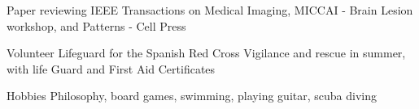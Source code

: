 
\begin{cvrefs}


\cvreference
{Paper reviewing}
{IEEE Transactions on Medical Imaging, MICCAI - Brain Lesion workshop, and Patterns - Cell Press}
{}

\cvreference
{Volunteer Lifeguard for the Spanish Red Cross}
{Vigilance and rescue in summer, with life Guard and First Aid Certificates}
{}

\cvreference
{Hobbies}
{Philosophy, board games, swimming, playing guitar, scuba diving}
{}


\end{cvrefs}
